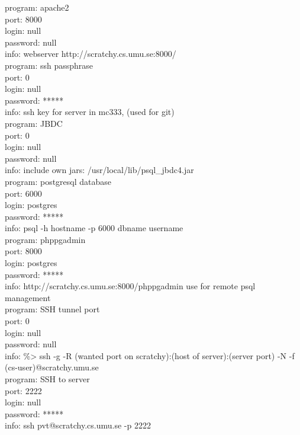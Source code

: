 \label{chap:servercmd}
program: apache2\\
port: 8000\\
login: null\\
password: null\\
info: webserver http://scratchy.cs.umu.se:8000/\\
\makebox[\linewidth]{\rule{\textwidth}{0.4pt}}
program: ssh passphrase\\
port: 0\\
login: null\\
password: *****\\
info: ssh key for server in mc333, (used for git)\\
\makebox[\linewidth]{\rule{\textwidth}{0.4pt}}
program: JBDC\\
port: 0\\
login: null\\
password: null\\
info: include own jars: /usr/local/lib/psql\_jbdc4.jar\\
\makebox[\linewidth]{\rule{\textwidth}{0.4pt}}
program: postgresql database\\
port: 6000\\
login: postgres\\
password: *****\\
info: psql -h hostname -p 6000 dbname username\\
\makebox[\linewidth]{\rule{\textwidth}{0.4pt}}
program: phppgadmin\\
port: 8000\\
login: postgres\\
password: *****\\
info: http://scratchy.cs.umu.se:8000/phppgadmin use for remote psql management\\
\makebox[\linewidth]{\rule{\textwidth}{0.4pt}}
program: SSH tunnel port\\
port: 0\\
login: null\\
password: null\\
info: \%> ssh -g -R (wanted port on scratchy):(host of server):(server port) -N -f (cs-user)@scratchy.umu.se\\
\makebox[\linewidth]{\rule{\textwidth}{0.4pt}}
program: SSH to server\\
port: 2222\\
login: null\\
password: *****\\
info: ssh pvt@scratchy.cs.umu.se -p 2222\\
